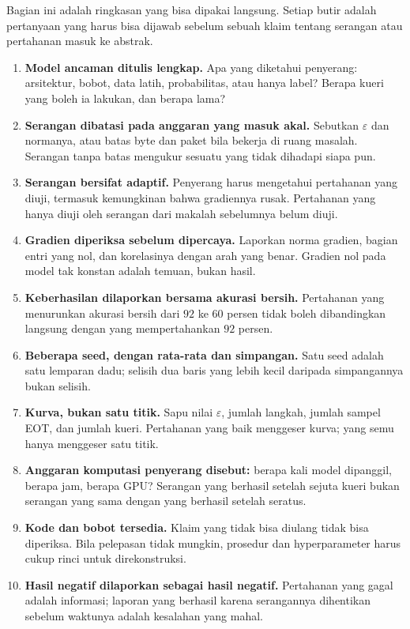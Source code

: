 Bagian ini adalah ringkasan yang bisa dipakai langsung. Setiap butir adalah pertanyaan
yang harus bisa dijawab sebelum sebuah klaim tentang serangan atau pertahanan masuk ke
abstrak.

\begin{enumerate}
  \item \textbf{Model ancaman ditulis lengkap.} Apa yang diketahui penyerang: arsitektur,
        bobot, data latih, probabilitas, atau hanya label? Berapa kueri yang boleh ia
        lakukan, dan berapa lama?
  \item \textbf{Serangan dibatasi pada anggaran yang masuk akal.} Sebutkan $\varepsilon$
        dan normanya, atau batas byte dan paket bila bekerja di ruang masalah. Serangan
        tanpa batas mengukur sesuatu yang tidak dihadapi siapa pun.
  \item \textbf{Serangan bersifat adaptif.}
        Penyerang harus mengetahui pertahanan yang diuji, termasuk kemungkinan bahwa
        gradiennya rusak. Pertahanan yang hanya diuji oleh serangan dari makalah
        sebelumnya belum diuji.
  \item \textbf{Gradien diperiksa sebelum dipercaya.} Laporkan norma gradien, bagian
        entri yang nol, dan korelasinya dengan arah yang benar. Gradien nol pada model
        tak konstan adalah temuan, bukan hasil.
  \item \textbf{Keberhasilan dilaporkan bersama akurasi bersih.} Pertahanan yang
        menurunkan akurasi bersih dari $92$ ke $60$ persen tidak boleh dibandingkan
        langsung dengan yang mempertahankan $92$ persen.
  \item \textbf{Beberapa seed, dengan rata-rata dan simpangan.} Satu seed adalah satu
        lemparan dadu; selisih dua baris yang lebih kecil daripada simpangannya bukan
        selisih.
  \item \textbf{Kurva, bukan satu titik.} Sapu nilai $\varepsilon$, jumlah langkah,
        jumlah sampel EOT, dan jumlah kueri. Pertahanan yang baik menggeser kurva;
        yang semu hanya menggeser satu titik.
  \item \textbf{Anggaran komputasi penyerang disebut:} berapa kali model dipanggil,
        berapa jam, berapa GPU? Serangan yang berhasil setelah sejuta kueri bukan
        serangan yang sama dengan yang berhasil setelah seratus.
  \item \textbf{Kode dan bobot tersedia.} Klaim yang tidak bisa diulang tidak bisa
        diperiksa. Bila pelepasan tidak mungkin, prosedur dan hyperparameter harus cukup
        rinci untuk direkonstruksi.
  \item \textbf{Hasil negatif dilaporkan sebagai hasil negatif.} Pertahanan yang gagal
        adalah informasi; laporan yang berhasil karena serangannya dihentikan sebelum
        waktunya adalah kesalahan yang mahal.
\end{enumerate}

